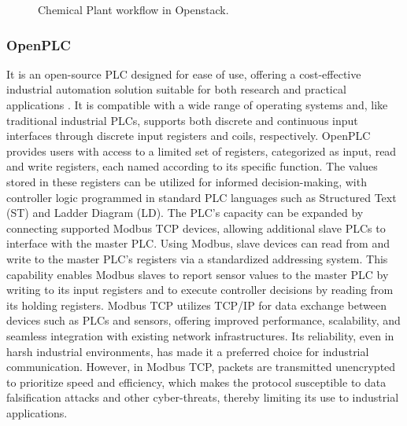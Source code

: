 \begin{figure}[!ht]
    \caption{Chemical Plant workflow in Openstack.}
    \label{fig:Chemical Plant}
\end{figure}
    \subsubsection{OpenPLC} It is an open-source PLC designed for ease of use, offering a cost-effective industrial automation solution suitable for both research and practical applications \cite{6970342}. It is compatible with a wide range of operating systems and, like traditional industrial PLCs, supports both discrete and continuous input interfaces through discrete input registers and coils, respectively. OpenPLC provides users with access to a limited set of registers, categorized as input, read and write registers, each named according to its specific function. The values stored in these registers can be utilized for informed decision-making, with controller logic programmed in standard PLC languages such as Structured Text (ST) and Ladder Diagram (LD). The PLC’s capacity can be expanded by connecting supported Modbus TCP devices, allowing additional slave PLCs to interface with the master PLC. Using Modbus, slave devices can read from and write to the master PLC’s registers via a standardized addressing system. This capability enables Modbus slaves to report sensor values to the master PLC by writing to its input registers and to execute controller decisions by reading from its holding registers. Modbus TCP utilizes TCP/IP for data exchange between devices such as PLCs and sensors, offering improved performance, scalability, and seamless integration with existing network infrastructures. Its reliability, even in harsh industrial environments, has made it a preferred choice for industrial communication.
    However, in Modbus TCP, packets are transmitted unencrypted to prioritize speed and efficiency, which makes the protocol susceptible to data falsification attacks and other cyber-threats, thereby limiting its use to industrial applications.
    
